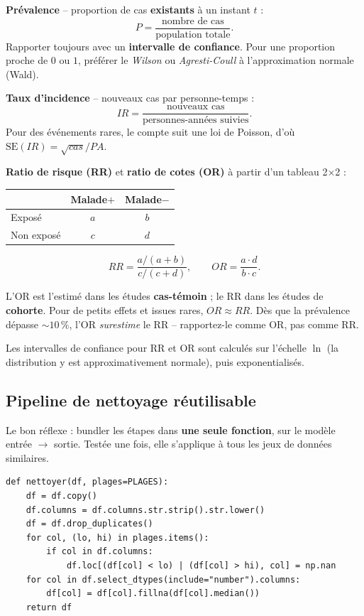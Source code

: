 \documentclass[11pt,a4paper]{article}
\begin{document}
\textbf{Pr\'evalence} -- proportion de cas \textbf{existants} \`a un
instant $t$ :
\[
P = \frac{\text{nombre de cas}}{\text{population totale}}.
\]
Rapporter toujours avec un \textbf{intervalle de confiance}. Pour une
proportion proche de $0$ ou $1$, pr\'ef\'erer le \emph{Wilson} ou
\emph{Agresti-Coull} \`a l'approximation normale (Wald).

\textbf{Taux d'incidence} -- nouveaux cas par personne-temps :
\[
IR = \frac{\text{nouveaux cas}}{\text{personnes-ann\'ees suivies}}.
\]
Pour des \'ev\'enements rares, le compte suit une loi de Poisson, d'o\`u
$\mathrm{SE}(IR) = \sqrt{cas} / PA$.

\textbf{Ratio de risque (RR)} et \textbf{ratio de cotes (OR)} \`a partir
d'un tableau 2$\times$2 :

\begin{center}
\begin{tabular}{lcc}
\toprule
              & Malade$+$ & Malade$-$ \\
\midrule
Expos\'e      & $a$       & $b$ \\
Non expos\'e  & $c$       & $d$ \\
\bottomrule
\end{tabular}
\end{center}

\[
RR = \frac{a/(a+b)}{c/(c+d)}, \qquad
OR = \frac{a \cdot d}{b \cdot c}.
\]

L'OR est l'estim\'e dans les \'etudes \textbf{cas-t\'emoin} ; le RR dans
les \'etudes de \textbf{cohorte}. Pour de petits effets et issues rares,
$OR \approx RR$. D\`es que la pr\'evalence d\'epasse $\sim 10\,\%$, l'OR
\emph{surestime} le RR -- rapportez-le comme OR, pas comme RR.

Les intervalles de confiance pour RR et OR sont calcul\'es sur l'\'echelle
$\ln$ (la distribution y est approximativement normale), puis
exponentialis\'es.

\subsection{Pipeline de nettoyage r\'eutilisable}

Le bon r\'eflexe : bundler les \'etapes dans \textbf{une seule fonction},
sur le mod\`ele entr\'ee $\to$ sortie. Test\'ee une fois, elle s'applique
\`a tous les jeux de donn\'ees similaires.

\begin{verbatim}
def nettoyer(df, plages=PLAGES):
    df = df.copy()
    df.columns = df.columns.str.strip().str.lower()
    df = df.drop_duplicates()
    for col, (lo, hi) in plages.items():
        if col in df.columns:
            df.loc[(df[col] < lo) | (df[col] > hi), col] = np.nan
    for col in df.select_dtypes(include="number").columns:
        df[col] = df[col].fillna(df[col].median())
    return df
\end{verbatim}
\end{document}
